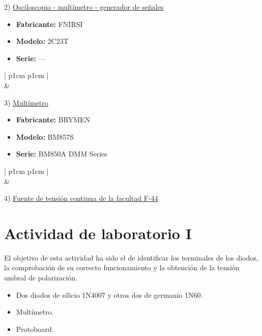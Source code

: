 2) \underline{Osciloscopio - multímetro - generador de señales}
\begin{itemize}
    \item \textbf{Fabricante:} FNIRSI
    \item \textbf{Modelo:} 2C23T
    \item \textbf{Serie:} ---
\end{itemize}
\begin{center}
    \begin{tabular}{| p{1cm}  p{1cm}  |}
        \hline
         \\
        \hline
         &
         \\
        \hline
    \end{tabular}
\end{center}

3) \underline{Multímetro}
\begin{itemize}
    \item \textbf{Fabricante:} BRYMEN
    \item \textbf{Modelo:} BM857S
    \item \textbf{Serie:} BM850A DMM Series
\end{itemize}
\begin{center}
    \begin{tabular}{| p{1cm}  p{1cm}  |}
        \hline
         \\
        \hline
         &
         \\
        \hline
    \end{tabular}
\end{center}

4) \underline{Fuente de tensión continua de la facultad F-44}

\section{Actividad de laboratorio I}
 El objetivo de esta actividad ha sido el de identificar los terminales de los diodos, la comprobación de su correcto funcionamiento y la obtención de la tensión umbral de polarización.
\newpage
 \begin{itemize}[noitemsep]
    \item Dos diodos de silicio 1N4007 y otros dos de germanio 1N60. \\
    \begin{center}   \end{center}
    \item Multímetro.
    \item Protoboard.
\end{itemize}
